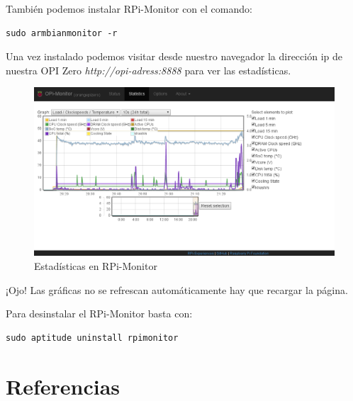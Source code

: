 \documentclass[12pt,spanish,]{scrartcl}
\begin{document}
También podemos instalar RPi-Monitor con el comando:

\begin{verbatim}
sudo armbianmonitor -r
\end{verbatim}

Una vez instalado podemos visitar desde nuestro navegador la dirección
ip de nuestra OPI Zero \emph{http://opi-adress:8888} para ver las
estadísticas.

\begin{figure}[htbp]
\centering
\includegraphics{src/img/rpimonitor.png}
\caption{Estadísticas en RPi-Monitor}
\end{figure}

¡Ojo! Las gráficas no se refrescan automáticamente hay que recargar la
página.

Para desinstalar el RPi-Monitor basta con:

\begin{verbatim}
sudo aptitude uninstall rpimonitor
\end{verbatim}

\section{Referencias}\label{referencias-1}
\end{document}
